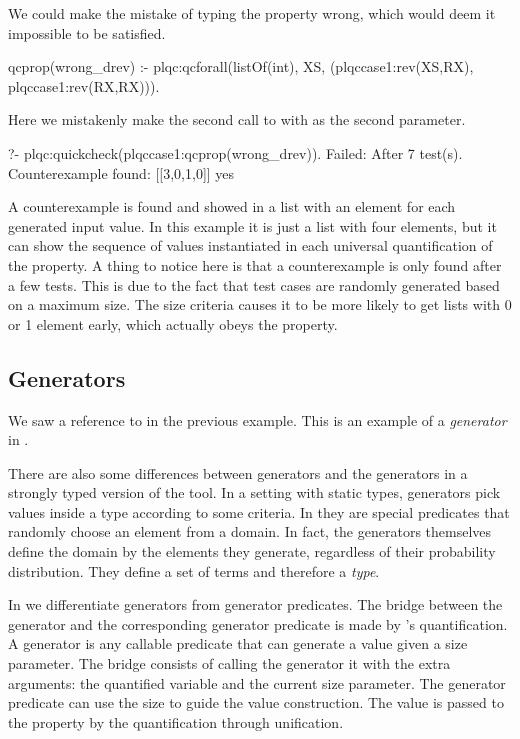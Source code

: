 We could make the mistake of typing the property wrong, which would deem
it impossible to be satisfied.
%
\begin{yapcode}
 qcprop(wrong_drev) :-
   plqc:qcforall(listOf(int), XS,
                 (plqccase1:rev(XS,RX),
                  plqccase1:rev(RX,RX))).
\end{yapcode}
%
Here we mistakenly make the second call to  with  as
the second parameter.
%
\begin{yapcode}
   ?- plqc:quickcheck(plqccase1:qcprop(wrong_drev)).
 Failed: After 7 test(s).
 Counterexample found: [[3,0,1,0]] 
 yes
\end{yapcode}
A counterexample is found and showed in a list with an element for each
generated input value.
%
In this example it is just a list with four elements, but it can show
the sequence of values instantiated in each universal quantification of
the property.
%
A thing to notice here is that a counterexample is only found after a
few tests.
%
This is due to the fact that test cases are randomly generated based on
a maximum size.
%
The size criteria causes it to be more likely to get lists with 0 or 1
element early, which actually obeys the property.


\subsection{Generators}
We saw a reference to  in the previous example.
%
This is an example of a \emph{generator} in \plqc{}.



There are also some differences between \plqc{} generators and the
generators in a strongly typed version of the tool.
%
In a setting with static types, generators pick values inside a type
according to some criteria.
%
In \plqc{} they are special predicates that randomly choose an element
from a domain.
%
In fact, the generators themselves define the domain by the elements
they generate, regardless of their probability distribution.
%
They define a set of terms and therefore a \emph{type}.


In \plqc{} we differentiate generators from generator predicates.
%
The bridge between the generator and the corresponding generator
predicate is made by \plqc{}'s quantification.
%
A generator is any callable predicate that can generate a value given a
size parameter.
%
The bridge consists of calling the generator it with the extra
arguments: the quantified variable and the current size parameter.
%
The generator predicate can use the size to guide the value
construction.
%
The value is passed to the property by the \plqc{} quantification
through unification.



